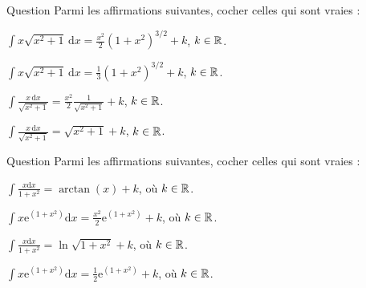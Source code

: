 \begin{multi}[multiple,feedback=
{Avec \(u=x^2+1\), on a \(\mathrm{d}u=2x\mathrm{d}x\). D'où
\[\int x\sqrt{x^2+1}\mathrm{d}x=\frac{1}{2}\int \sqrt{u}\mathrm{d}u=\frac{u^{3/2}}{3}+k=\frac{1}{3}(1+x^2)^{3/2}+k,\; k\in \Rr,\]
et
\[\int \frac{x\mathrm{d}x}{\sqrt{x^2+1}}=\int \frac{\mathrm{d}u}{2\sqrt{u}}=\sqrt{u}+k=\sqrt{x^2+1}+k,\; k\in \Rr.\]
}]{Question}
Parmi les affirmations suivantes, cocher celles qui sont vraies :

    \item \(\displaystyle \int x\sqrt{x^2+1}\, \mathrm{d}x=\frac{x^2}{2}(1+x^2)^{3/2}+k\), \(k\in \mathbb{R}\).
    \item* \(\displaystyle \int x\sqrt{x^2+1}\, \mathrm{d}x=\frac{1}{3}(1+x^2)^{3/2}+k\), \(k\in \mathbb{R}\).
    \item \(\displaystyle \int \frac{x\, \mathrm{d}x}{\sqrt{x^2+1}}=\frac{x^2}{2}\frac{1}{\sqrt{x^2+1}}+k\), \(k\in \mathbb{R}\).
    \item* \(\displaystyle \int \frac{x\, \mathrm{d}x}{\sqrt{x^2+1}}=\sqrt{x^2+1}+k\), \(k\in \mathbb{R}\).
\end{multi}


\begin{multi}[multiple,feedback=
{Avec \(u=1+x^2\), on a : \(\mathrm{d}u=2x\mathrm{d}x\). D'où
\[\int \frac{x\mathrm{d}x}{1+x^2}=\frac{1}{2}\int \frac{\mathrm{d}u}{u}=\frac{1}{2}\ln (u)+k=\ln\sqrt{1+x^2}+k,\; k\in \Rr,\]
et 
\[\int x\mathrm{e}^{(1+x^2)}\mathrm{d}x=\frac{1}{2}\int \mathrm{e}^u\mathrm{d}u=\frac{1}{2}\mathrm{e}^u+k=\frac{1}{2}\mathrm{e}^{(1+x^2)}+k,\; k\in \Rr.\]
}]{Question}
Parmi les affirmations suivantes, cocher celles qui sont vraies :

    \item \(\displaystyle \int \frac{x\mathrm{d}x}{1+x^2}=\arctan (x)+k\), où \(k\in \mathbb{R}\).
    \item \(\displaystyle \int x\mathrm{e}^{(1+x^2)}\mathrm{d}x=\frac{x^2}{2}\mathrm{e}^{(1+x^2)}+k\), où \(k\in \mathbb{R}\).
    \item* \(\displaystyle \int \frac{x\mathrm{d}x}{1+x^2}=\ln\sqrt{1+x^2}+k\), où \(k\in \mathbb{R}\).
    \item* \(\displaystyle \int x\mathrm{e}^{(1+x^2)}\mathrm{d}x=\frac{1}{2}\mathrm{e}^{(1+x^2)}+k\), où \(k\in \mathbb{R}\).
\end{multi}


